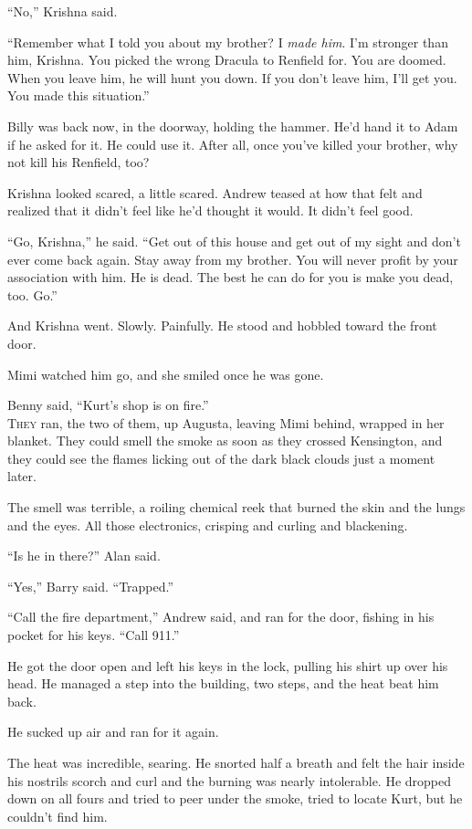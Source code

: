 ``No,'' Krishna said. 

``Remember what I told you about my brother?  I \textit{made him}. 
I'm stronger than him, Krishna.  You picked the wrong Dracula to
Renfield for.  You are doomed.  When you leave him, he will hunt you
down.  If you don't leave him, I'll get you.  You made this
situation.''

Billy was back now, in the doorway, holding the hammer.  He'd hand it
to Adam if he asked for it.  He could use it.  After all, once you've
killed your brother, why not kill his Renfield, too?

Krishna looked scared, a little scared.  Andrew teased at how that
felt and realized that it didn't feel like he'd thought it would.  It
didn't feel good. 

``Go, Krishna,'' he said.  ``Get out of this house and get out of my
sight and don't ever come back again.  Stay away from my brother.  You
will never profit by your association with him.  He is dead.  The best
he can do for you is make you dead, too.  Go.''

And Krishna went.  Slowly.  Painfully.  He stood and hobbled toward
the front door.

Mimi watched him go, and she smiled once he was gone.

Benny said, ``Kurt's shop is on fire.''
\\
\lettrine[lines=3, lhang=.5, nindent=0pt, findent=2pt]{T}{hey} ran, the two of them, up Augusta, leaving Mimi behind, wrapped in
her blanket.  They could smell the smoke as soon as they crossed
Kensington, and they could see the flames licking out of the dark
black clouds just a moment later.

The smell was terrible, a roiling chemical reek that burned the skin
and the lungs and the eyes.  All those electronics, crisping and
curling and blackening.

``Is he in there?'' Alan said. 

``Yes,'' Barry said.  ``Trapped.''

``Call the fire department,'' Andrew said, and ran for the door,
fishing in his pocket for his keys.  ``Call 911.''

He got the door open and left his keys in the lock, pulling his shirt
up over his head.  He managed a step into the building, two steps, and
the heat beat him back. 

He sucked up air and ran for it again. 

The heat was incredible, searing.  He snorted half a breath and felt
the hair inside his nostrils scorch and curl and the burning was
nearly intolerable.  He dropped down on all fours and tried to peer
under the smoke, tried to locate Kurt, but he couldn't find him.

